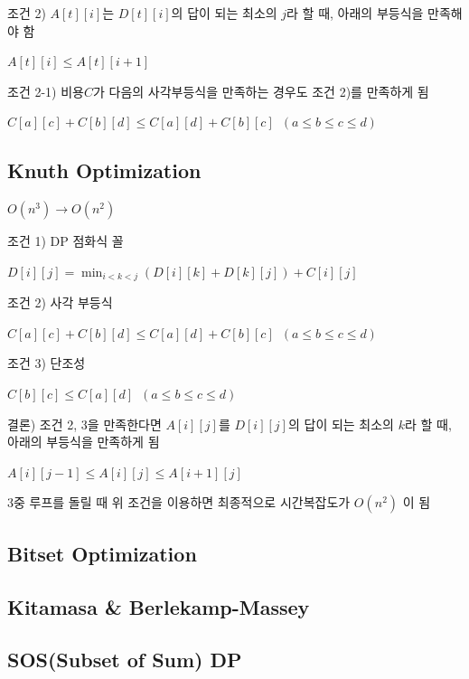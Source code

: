 \documentclass[9pt,landscape,a4paper,twocolumn]{extarticle}
\begin{document}
조건 2) $A[t][i]$는 $D[t][i]$의 답이 되는 최소의 $j$라 할 때, 아래의 부등식을 만족해야 함

$A[t][i] \leq A[t][i+1]$

조건 2-1) 비용$C$가 다음의 사각부등식을 만족하는 경우도 조건 2)를 만족하게 됨

$C[a][c] + C[b][d] \leq C[a][d] + C[b][c] \phantom{1} (a \leq b \leq c \leq d)$



\subsection{Knuth Optimization}

$O(n^{3}) \to O(n^{2})$

조건 1) DP 점화식 꼴

$D[i][j] = \min_{i<k<j}( D[i][k] + D[k][j] ) + C[i][j]$

조건 2) 사각 부등식

$C[a][c] + C[b][d] \leq C[a][d] + C[b][c] \phantom{1} (a \leq b \leq c \leq d)$

조건 3) 단조성

$C[b][c] \leq C[a][d] \phantom{1} (a \leq b \leq c \leq d)$

결론) 조건 2, 3을 만족한다면  $A[i][j]$를 $D[i][j]$의 답이 되는 최소의 $k$라 할 때, 아래의 부등식을 만족하게 됨

$A[i][j-1] \leq A[i][j] \leq A[i+1][j]$

3중 루프를 돌릴 때 위 조건을 이용하면 최종적으로 시간복잡도가 $O(n^{2})$ 이 됨



\subsection{Bitset Optimization}


\subsection{Kitamasa \& Berlekamp-Massey}

% 
\subsection{SOS(Subset of Sum) DP}

\end{document}
